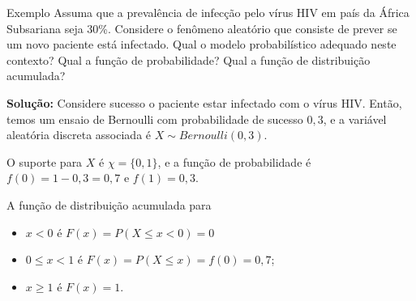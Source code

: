 \documentclass[9pt]{beamer}
\begin{document}
\begin{frame}{Exemplo}
Assuma que a prevalência de infecção pelo vírus HIV em país da África Subsariana seja 30\%. Considere o fenômeno aleatório que consiste de prever se um novo paciente está infectado. Qual o modelo probabilístico adequado neste 
contexto? Qual a função de probabilidade? Qual a função de distribuição acumulada?
\vfill

\textbf{Solução:} Considere sucesso o paciente estar infectado com o vírus HIV. Então, temos um ensaio de Bernoulli com probabilidade de sucesso
$0,3$, e a variável aleatória discreta associada é $X \sim Bernoulli(0,3)$. 

O suporte para $X$ é $\chi=\{0,1\}$, e a função de probabilidade é $f(0)=1-0,3=0,7$ e $f(1)=0,3$. 

A função de distribuição acumulada para
\begin{itemize}
 \item $x < 0$ é $F(x) = P(X \leq x < 0) = 0$
 \item $0 \leq x < 1$ é $F(x) = P(X \leq x) = f(0) = 0,7$;
 \item $x \geq 1$ é $F(x) =1$.
\end{itemize}

\begin{figure}
 \centering
\end{figure}


\end{frame}
\end{document}

